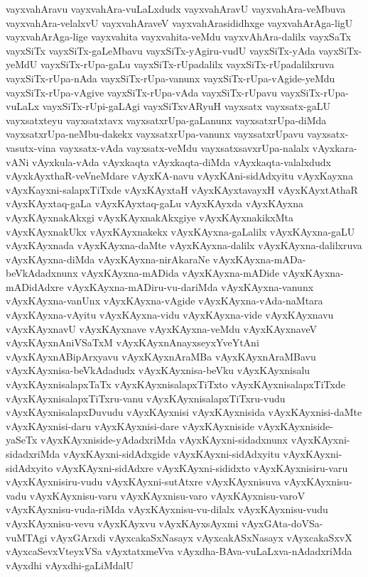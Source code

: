{vayxvahAravu
vayxvahAra-vuLaLxdudx
vayxvahAravU
vayxvahAra-veMbuva
vayxvahAra-velalxvU
vayxvahAraveV
vayxvahArasididhxge
vayxvahArAga-ligU
vayxvahArAga-lige
vayxvahita
vayxvahita-veMdu
vayxvAhAra-dalilx
vayxSaTx
vayxSiTx
vayxSiTx-gaLeMbavu
vayxSiTx-yAgiru-vudU
vayxSiTx-yAda
vayxSiTx-yeMdU
vayxSiTx-rUpa-gaLu
vayxSiTx-rUpadalilx
vayxSiTx-rUpadalilxruva
vayxSiTx-rUpa-nAda
vayxSiTx-rUpa-vanunx
vayxSiTx-rUpa-vAgide-yeMdu
vayxSiTx-rUpa-vAgive
vayxSiTx-rUpa-vAda
vayxSiTx-rUpavu
vayxSiTx-rUpa-vuLaLx
vayxSiTx-rUpi-gaLAgi
vayxSiTxvARyuH
vayxsatx
vayxsatx-gaLU
vayxsatxteyu
vayxsatxtavx
vayxsatxrUpa-gaLanunx
vayxsatxrUpa-diMda
vayxsatxrUpa-neMbu-dakekx
vayxsatxrUpa-vanunx
vayxsatxrUpavu
vayxsatx-vasutx-vina
vayxsatx-vAda
vayxsatx-veMdu
vayxsatxsavxrUpa-nalalx
vAyxkara-vANi
vAyxkula-vAda
vAyxkaqta
vAyxkaqta-diMda
vAyxkaqta-valalxdudx
vAyxkAyxthaR-veVneMdare
vAyxKA-navu
vAyxKAni-sidAdxyitu
vAyxKayxna
vAyxKayxni-salapxTiTxde
vAyxKAyxtaH
vAyxKAyxtavayxH
vAyxKAyxtAthaR
vAyxKAyxtaq-gaLa
vAyxKAyxtaq-gaLu
vAyxKAyxda
vAyxKAyxna
vAyxKAyxnakAkxgi
vAyxKAyxnakAkxgiye
vAyxKAyxnakikxMta
vAyxKAyxnakUkx
vAyxKAyxnakekx
vAyxKAyxna-gaLalilx
vAyxKAyxna-gaLU
vAyxKAyxnada
vAyxKAyxna-daMte
vAyxKAyxna-dalilx
vAyxKAyxna-dalilxruva
vAyxKAyxna-diMda
vAyxKAyxna-nirAkaraNe
vAyxKAyxna-mADa-beVkAdadxnunx
vAyxKAyxna-mADida
vAyxKAyxna-mADide
vAyxKAyxna-mADidAdxre
vAyxKAyxna-mADiru-vu-dariMda
vAyxKAyxna-vanunx
vAyxKAyxna-vanUnx
vAyxKAyxna-vAgide
vAyxKAyxna-vAda-naMtara
vAyxKAyxna-vAyitu
vAyxKAyxna-vidu
vAyxKAyxna-vide
vAyxKAyxnavu
vAyxKAyxnavU
vAyxKAyxnave
vAyxKAyxna-veMdu
vAyxKAyxnaveV
vAyxKAyxnAniVSaTxM
vAyxKAyxnAnayxseyxYveYtAni
vAyxKAyxnABipArxyavu
vAyxKAyxnAraMBa
vAyxKAyxnAraMBavu
vAyxKAyxnisa-beVkAdadudx
vAyxKAyxnisa-beVku
vAyxKAyxnisalu
vAyxKAyxnisalapxTaTx
vAyxKAyxnisalapxTiTxto
vAyxKAyxnisalapxTiTxde
vAyxKAyxnisalapxTiTxru-vanu
vAyxKAyxnisalapxTiTxru-vudu
vAyxKAyxnisalapxDuvudu
vAyxKAyxnisi
vAyxKAyxnisida
vAyxKAyxnisi-daMte
vAyxKAyxnisi-daru
vAyxKAyxnisi-dare
vAyxKAyxniside
vAyxKAyxniside-yaSeTx
vAyxKAyxniside-yAdadxriMda
vAyxKAyxni-sidadxnunx
vAyxKAyxni-sidadxriMda
vAyxKAyxni-sidAdxgide
vAyxKAyxni-sidAdxyitu
vAyxKAyxni-sidAdxyito
vAyxKAyxni-sidAdxre
vAyxKAyxni-sididxto
vAyxKAyxnisiru-varu
vAyxKAyxnisiru-vudu
vAyxKAyxni-sutAtxre
vAyxKAyxnisuva
vAyxKAyxnisu-vadu
vAyxKAyxnisu-varu
vAyxKAyxnisu-varo
vAyxKAyxnisu-varoV
vAyxKAyxnisu-vuda-riMda
vAyxKAyxnisu-vu-dilalx
vAyxKAyxnisu-vudu
vAyxKAyxnisu-vevu
vAyxKAyxvu
vAyxKAyxsAyxmi
vAyxGAta-doVSa-vuMTAgi
vAyxGArxdi
vAyxcakaSxNasayx
vAyxcakASxNasayx
vAyxcakaSxvX
vAyxcaSevxVteyxVSa
vAyxtatxmeVva
vAyxdha-BAva-vuLaLxva-nAdadxriMda
vAyxdhi
vAyxdhi-gaLiMdalU
}
